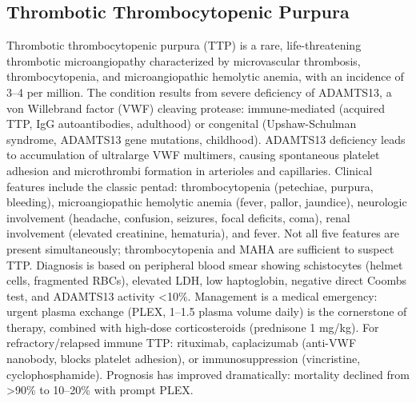 \subsection{Thrombotic Thrombocytopenic Purpura}
\label{sec:Thrombotic Thrombocytopenic Purpura}
Thrombotic thrombocytopenic purpura (TTP) is a rare, life-threatening thrombotic microangiopathy characterized by microvascular thrombosis, thrombocytopenia, and microangiopathic hemolytic anemia, with an incidence of 3--4 per million. The condition results from severe deficiency of ADAMTS13, a von Willebrand factor (VWF) cleaving protease: immune-mediated (acquired TTP, IgG autoantibodies, adulthood) or congenital (Upshaw-Schulman syndrome, ADAMTS13 gene mutations, childhood). ADAMTS13 deficiency leads to accumulation of ultralarge VWF multimers, causing spontaneous platelet adhesion and microthrombi formation in arterioles and capillaries. Clinical features include the classic pentad: thrombocytopenia (petechiae, purpura, bleeding), microangiopathic hemolytic anemia (fever, pallor, jaundice), neurologic involvement (headache, confusion, seizures, focal deficits, coma), renal involvement (elevated creatinine, hematuria), and fever. Not all five features are present simultaneously; thrombocytopenia and MAHA are sufficient to suspect TTP. Diagnosis is based on peripheral blood smear showing schistocytes (helmet cells, fragmented RBCs), elevated LDH, low haptoglobin, negative direct Coombs test, and ADAMTS13 activity <10\%. Management is a medical emergency: urgent plasma exchange (PLEX, 1--1.5 plasma volume daily) is the cornerstone of therapy, combined with high-dose corticosteroids (prednisone 1 mg/kg). For refractory/relapsed immune TTP: rituximab, caplacizumab (anti-VWF nanobody, blocks platelet adhesion), or immunosuppression (vincristine, cyclophosphamide). Prognosis has improved dramatically: mortality declined from >90\% to 10--20\% with prompt PLEX.

